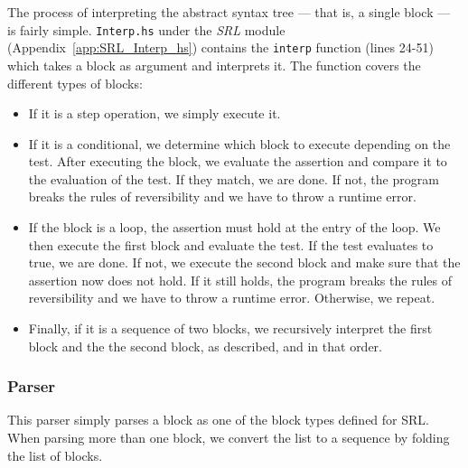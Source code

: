 The process of interpreting the abstract syntax tree --- that is, a single block --- is fairly simple. \texttt{Interp.hs} under the \textit{SRL} module (Appendix~\ref{app:SRL_Interp_hs}) contains the \texttt{interp} function (lines 24-51) which takes a block as argument and interprets it. The function covers the different types of blocks:
\begin{itemize}
  \item If it is a step operation, we simply execute it.

  \item If it is a conditional, we determine which block to execute depending on the test. After executing the block, we evaluate the assertion and compare it to the evaluation of the test. If they match, we are done. If not, the program breaks the rules of reversibility and we have to throw a runtime error.

  \item If the block is a loop, the assertion must hold at the entry of the loop. We then execute the first block and evaluate the test. If the test evaluates to true, we are done. If not, we execute the second block and make sure that the assertion now does not hold. If it still holds, the program breaks the rules of reversibility and we have to throw a runtime error. Otherwise, we repeat.

  \item Finally, if it is a sequence of two blocks, we recursively interpret the first block and the the second block, as described, and in that order.
\end{itemize}

%  

\subsubsection{Parser}

This parser simply parses a block as one of the block types defined for SRL. When parsing more than one block, we convert the list to a sequence by folding the list of blocks.
